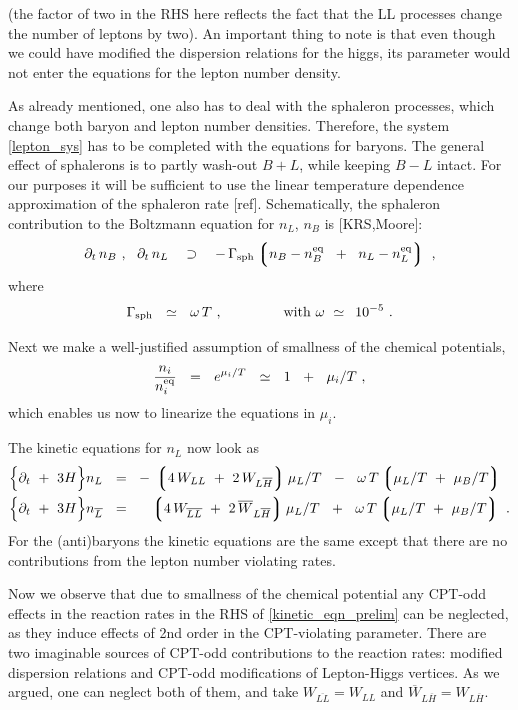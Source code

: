 \documentclass[12pt]{revtex4}
\newcommand{\eq}{{\rm eq}}
\newcommand{\lgr}{\left\lgroup}
\newcommand{\rgr}{\right\rgroup}
\newcommand{\Gsph}{\Gamma_{\rm sph}}
\newcommand{\p}{\partial}
\newcommand{\ov}{\overline}
\begin{document}
	(the factor of two in the RHS here reflects the fact 
	that the LL processes change the number of leptons by two).
	An important thing to note is that even though we could have 
	modified the dispersion relations for the higgs, 
	its parameter would not enter the equations for the lepton number
	density.

	As already mentioned,
	one also has to deal with the sphaleron processes, which change
	both baryon and lepton number densities.
	Therefore, the system \eqref{lepton_sys} has to be completed with
	the equations for baryons.
	The general effect of sphalerons is to partly wash-out $ B + L $,
	while keeping $ B - L $ intact.
	For our purposes it will be sufficient to use the linear
	temperature dependence approximation of the sphaleron rate [ref]. 
	Schematically, the sphaleron contribution to the Boltzmann equation
	for $ n_L $, $ n_B $ is [KRS,Moore]:
\begin{equation}
\label{sph_corr}
	\p_t\, n_B~,~~
	\p_t\, n_L
	~~~\supset~~~ -\, \Gsph 
		\lgr   n_B - n_B^\eq \;~+~\;
		       n_L - n_L^\eq 
		\rgr~,
\end{equation}
	where
\[
	\Gsph ~~\simeq~~ \omega\, T~, \qquad\qquad 
	{\rm ~with~}
	\omega ~\simeq~ \,10^{-5}~.
\]
	
	
	Next we make a well-justified assumption of 
	smallness of the chemical potentials,
\[
	\frac{n_i}{n_i^\eq} ~~=~~ e^{\mu_i/T} ~~\simeq~~ 1 ~~+~~ \mu_i/T~,
\]
	which enables us now to linearize the equations in $ \mu_i $.

	The kinetic equations for $ n_L $ now look as
\begin{equation}
\label{kinetic_eqn_prelim}
\begin{split}
	\Bigl\{ \p_t ~+~ 3H \Bigr\}
		n_L ~~=~~ & 
	-\, \lgr 4\, W_{LL} ~+~ 2\, W_{L\ov{H}} \rgr  \mu_L/T 
	~~-~~
	\omega\, T \lgr \mu_L/T ~+~ \mu_B/T \rgr 
	\\
	\Bigl\{ \p_t ~+~ 3H \Bigr\} 
		n_{\ov{L}} ~~=~~ &
	\phantom{-\,}
	\lgr 4\, W_{\ov{LL}} ~+~ 2\, \ov{W}_{L\ov{H}} \rgr  \mu_L/T 
	~~+~~
	\omega\, T \lgr \mu_L/T ~+~ \mu_B/T \rgr ~.
\end{split}
\end{equation}
	For the (anti)baryons the kinetic equations are the same except
	that there are no contributions from the lepton number violating
	rates.

	Now we observe that due to smallness of the chemical potential
	any CPT-odd effects in the reaction rates in the RHS of 
	\eqref{kinetic_eqn_prelim} can be neglected, as
	they induce effects of 2nd order in the CPT-violating parameter.
	There are two imaginable sources of CPT-odd contributions 
	to the reaction rates: modified dispersion relations and 
	CPT-odd modifications of Lepton-Higgs vertices. 
	As we argued, one can neglect both of them, and take
	$ W_{\ov{LL}} = W_{LL} $ and
	$ \ov{W}_{L\ov{H}} = W_{L\ov{H}} $.
\end{document}
